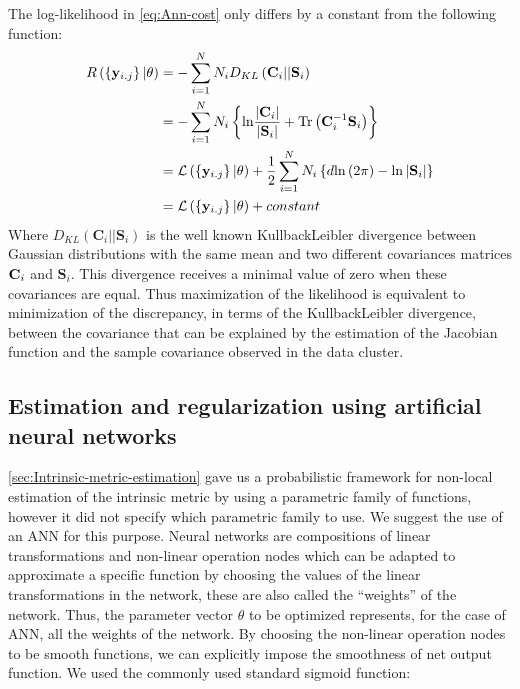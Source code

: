 	The log-likelihood in \cref{eq:Ann-cost} only differs by a constant from the following function:
	\begin{equation}
	\begin{aligned}R\left(\left\{ {\bf y}_{i.j}\right\} |\theta\right) & =-\sum_{i=1}^{N}N_{i}D_{KL}\left(\mathbf{C}_{i}||\mathbf{S}_{i}\right)\\
	& =-\sum_{i=1}^{N}N_{i}\left\{ \text{ln}\frac{\left|\mathbf{C}_{i}\right|}{\left|\mathbf{S}_{i}\right|}+\text{Tr}\left(\mathbf{C}_{i}^{-1}\mathbf{S}_{i}\right)\right\} \\
	& =\mathcal{L}\left(\left\{ {\bf y}_{i.j}\right\} |\theta\right)+\frac{1}{2}\sum_{i=1}^{N}N_{i}\left\{ d\text{ln}\left(2\pi\right)-\text{ln}\left|\mathbf{S}_{i}\right|\right\} \\
	& =\mathcal{L}\left(\left\{ {\bf y}_{i.j}\right\} |\theta\right)+constant
	\end{aligned}
	\label{eq:KL}
	\end{equation}
	Where $D_{KL}\left(\mathbf{C}_{i}||\mathbf{S}_{i}\right)$ is the well known Kullback\textendash Leibler divergence between Gaussian distributions with the same mean and two different covariances matrices $\text{\ensuremath{\mathbf{C}_{i}}}$ and $\mathbf{S}_{i}$. This divergence receives a minimal value of zero when these covariances are equal. Thus maximization of the likelihood is equivalent to minimization of the discrepancy, in terms of the Kullback\textendash Leibler divergence, between the covariance that can be explained by the estimation of the Jacobian function and the sample covariance observed in the data cluster. 
	
	\subsection{Estimation and regularization using artificial neural networks}
	
	\cref{sec:Intrinsic-metric-estimation} gave us a probabilistic framework for non-local estimation of the intrinsic metric by using a parametric family of functions, however it did not specify which parametric family to use. We suggest the use of an \ac{ANN} for this purpose. Neural networks are compositions of linear transformations and non-linear operation nodes which can be adapted to approximate a specific function by choosing the values of the linear transformations in the network, these are also called the ``weights'' of the network. Thus, the parameter vector $\theta$ to be optimized represents, for the case of \ac{ANN}, all the weights of the network. By choosing the non-linear operation nodes to be smooth functions, we can explicitly impose the smoothness of net output function. We used the commonly used standard sigmoid function:
	

